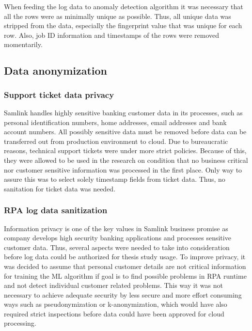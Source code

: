 When feeding the log data to anomaly detection algorithm
it was necessary that all the rows were
as minimally unique as possible.
Thus, all unique data was stripped from the data,
especially the fingerprint value
that was unique for each row.
Also,
job ID information and timestamps of the rows
were removed momentarily.


\subsection{Data anonymization}\label{subsec:meth-data-anonymization}

\subsubsection*{Support ticket data privacy}
Samlink handles highly sensitive banking customer data in its processes,
such as personal identification numbers, home addresses, email addresses and bank account numbers.
All possibly sensitive data must be removed
before data can be transferred out from production environment to cloud.
Due to bureaucratic reasons,
technical support tickets were under more strict policies.
Because of this,
they were allowed to be used in the research
on condition that no business critical nor customer sensitive information
was processed in the first place.
Only way to assure this
was to select solely timestamp fields from ticket data.
Thus, no sanitation for ticket data was needed.

\subsubsection*{RPA log data sanitization}
Information privacy is one of the key values in Samlink business promise
as company develops high security banking applications
and processes sensitive customer data.
Thus, several aspects were needed to take into consideration
before log data could be authorized for thesis study usage.
To improve privacy,
it was decided to assume
that personal customer details are not critical information
for training the ML algorithm
if goal is to find possible problems in RPA runtime
and not detect individual customer related problems.
This way it was not necessary to achieve adequate security
by less secure and more effort consuming ways
such as pseudonymization or k-anonymization,
which would have also required strict inspections
before data could have been approved for cloud processing.

